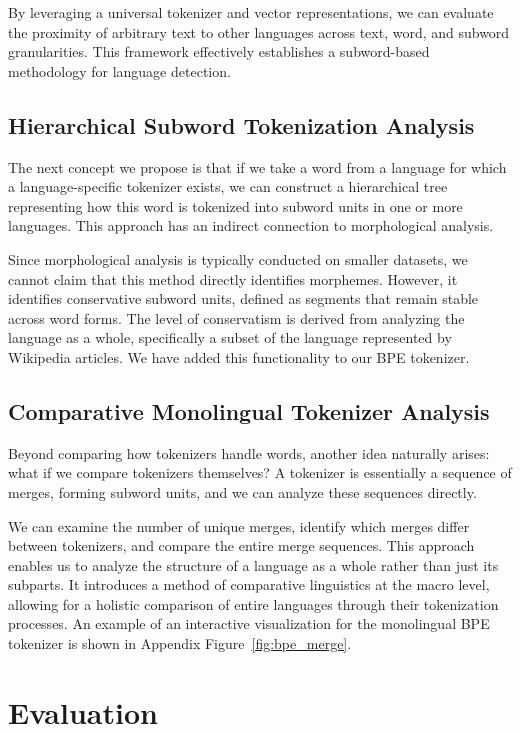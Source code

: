 \documentclass[11pt]{article}
\begin{document}
By leveraging a universal tokenizer and vector representations, we can evaluate the proximity of arbitrary text to other languages across text, word, and subword granularities. This framework effectively establishes a subword-based methodology for language detection.

\subsection{Hierarchical Subword Tokenization Analysis}
\label{sec:hier}

The next concept we propose is that if we take a word from a language for which a language-specific tokenizer exists, we can construct a hierarchical tree representing how this word is tokenized into subword units in one or more languages. This approach has an indirect connection to morphological analysis.

Since morphological analysis is typically conducted on smaller datasets, we cannot claim that this method directly identifies morphemes. However, it identifies conservative subword units, defined as segments that remain stable across word forms. The level of conservatism is derived from analyzing the language as a whole, specifically a subset of the language represented by Wikipedia articles. We have added this functionality to our BPE tokenizer.

\subsection{Comparative Monolingual Tokenizer Analysis}
\label{sec:merges}

Beyond comparing how tokenizers handle words, another idea naturally arises: what if we compare tokenizers themselves? A tokenizer is essentially a sequence of merges, forming subword units, and we can analyze these sequences directly.

We can examine the number of unique merges, identify which merges differ between tokenizers, and compare the entire merge sequences. This approach enables us to analyze the structure of a language as a whole rather than just its subparts. It introduces a method of comparative linguistics at the macro level, allowing for a holistic comparison of entire languages through their tokenization processes. An example of an interactive visualization for the monolingual BPE tokenizer is shown in Appendix Figure~\ref{fig:bpe_merge}.

\section{Evaluation}
\end{document}
